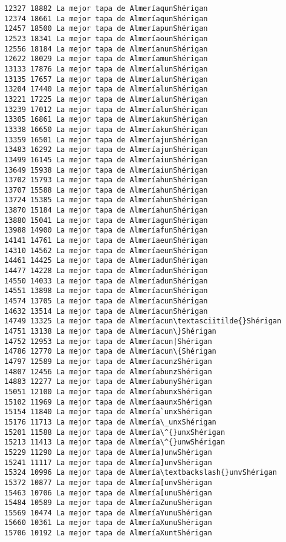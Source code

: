 \documentclass[11pt]{article}
\begin{document}
\begin{Verbatim}[commandchars=\\\{\}]
12327 18882 La mejor tapa de AlmeríaqunShérigan
12374 18661 La mejor tapa de AlmeríaqunShérigan
12457 18500 La mejor tapa de AlmeríapunShérigan
12523 18341 La mejor tapa de AlmeríaounShérigan
12556 18184 La mejor tapa de AlmeríanunShérigan
12622 18029 La mejor tapa de AlmeríamunShérigan
13133 17876 La mejor tapa de AlmeríalunShérigan
13135 17657 La mejor tapa de AlmeríalunShérigan
13204 17440 La mejor tapa de AlmeríalunShérigan
13221 17225 La mejor tapa de AlmeríalunShérigan
13239 17012 La mejor tapa de AlmeríalunShérigan
13305 16861 La mejor tapa de AlmeríakunShérigan
13338 16650 La mejor tapa de AlmeríakunShérigan
13359 16501 La mejor tapa de AlmeríajunShérigan
13483 16292 La mejor tapa de AlmeríajunShérigan
13499 16145 La mejor tapa de AlmeríaiunShérigan
13649 15938 La mejor tapa de AlmeríaiunShérigan
13702 15793 La mejor tapa de AlmeríahunShérigan
13707 15588 La mejor tapa de AlmeríahunShérigan
13724 15385 La mejor tapa de AlmeríahunShérigan
13870 15184 La mejor tapa de AlmeríahunShérigan
13880 15041 La mejor tapa de AlmeríagunShérigan
13988 14900 La mejor tapa de AlmeríafunShérigan
14141 14761 La mejor tapa de AlmeríaeunShérigan
14310 14562 La mejor tapa de AlmeríaeunShérigan
14461 14425 La mejor tapa de AlmeríadunShérigan
14477 14228 La mejor tapa de AlmeríadunShérigan
14550 14033 La mejor tapa de AlmeríadunShérigan
14551 13898 La mejor tapa de AlmeríacunShérigan
14574 13705 La mejor tapa de AlmeríacunShérigan
14632 13514 La mejor tapa de AlmeríacunShérigan
14749 13325 La mejor tapa de Almeríacun\textasciitilde{}Shérigan
14751 13138 La mejor tapa de Almeríacun\}Shérigan
14752 12953 La mejor tapa de Almeríacun|Shérigan
14786 12770 La mejor tapa de Almeríacun\{Shérigan
14797 12589 La mejor tapa de AlmeríacunzShérigan
14807 12456 La mejor tapa de AlmeríabunzShérigan
14883 12277 La mejor tapa de AlmeríabunyShérigan
15051 12100 La mejor tapa de AlmeríabunxShérigan
15102 11969 La mejor tapa de AlmeríaaunxShérigan
15154 11840 La mejor tapa de Almería`unxShérigan
15176 11713 La mejor tapa de Almería\_unxShérigan
15201 11588 La mejor tapa de Almería\^{}unxShérigan
15213 11413 La mejor tapa de Almería\^{}unwShérigan
15229 11290 La mejor tapa de Almería]unwShérigan
15241 11117 La mejor tapa de Almería]unvShérigan
15324 10996 La mejor tapa de Almería\textbackslash{}unvShérigan
15372 10877 La mejor tapa de Almería[unvShérigan
15463 10706 La mejor tapa de Almería[unuShérigan
15484 10589 La mejor tapa de AlmeríaZunuShérigan
15569 10474 La mejor tapa de AlmeríaYunuShérigan
15660 10361 La mejor tapa de AlmeríaXunuShérigan
15706 10192 La mejor tapa de AlmeríaXuntShérigan

\end{Verbatim}
\end{document}

